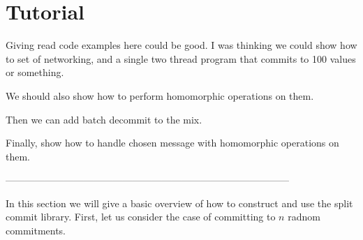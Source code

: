 \section{Tutorial}

Giving read code examples here could be good. I was thinking we could show how to set of networking, and a single two thread program that commits to 100 values or something.

We should also show how to perform homomorphic operations on them.

Then we can add batch decommit to the mix.

Finally, show how to handle chosen message with homomorphic operations on them.

---------------------------------------------------------------------------------------

In this section we will give a basic overview of how to construct and use the split commit library. First, let us consider the case of committing to $n$ radnom commitments.